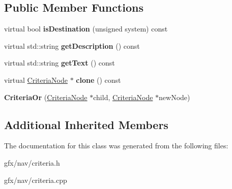 \subsection*{Public Member Functions}
\begin{DoxyCompactItemize}
\item 
virtual bool {\bfseries is\+Destination} (unsigned system) const \hypertarget{classCriteriaOr_af82948cae82350abac4d4ce358ad3736}{}\label{classCriteriaOr_af82948cae82350abac4d4ce358ad3736}

\item 
virtual std\+::string {\bfseries get\+Description} () const \hypertarget{classCriteriaOr_afd2b4d793179caf2f3731a626425c991}{}\label{classCriteriaOr_afd2b4d793179caf2f3731a626425c991}

\item 
virtual std\+::string {\bfseries get\+Text} () const \hypertarget{classCriteriaOr_a97bdb7d3088016af45324b69352e9972}{}\label{classCriteriaOr_a97bdb7d3088016af45324b69352e9972}

\item 
virtual \hyperlink{classCriteriaNode}{Criteria\+Node} $\ast$ {\bfseries clone} () const \hypertarget{classCriteriaOr_afaf885c6b7b3d9616f486652e490f4c6}{}\label{classCriteriaOr_afaf885c6b7b3d9616f486652e490f4c6}

\item 
{\bfseries Criteria\+Or} (\hyperlink{classCriteriaNode}{Criteria\+Node} $\ast$child, \hyperlink{classCriteriaNode}{Criteria\+Node} $\ast$new\+Node)\hypertarget{classCriteriaOr_a0124e6bf414ca4060a2bd1b9fccf9699}{}\label{classCriteriaOr_a0124e6bf414ca4060a2bd1b9fccf9699}

\end{DoxyCompactItemize}
\subsection*{Additional Inherited Members}


The documentation for this class was generated from the following files\+:\begin{DoxyCompactItemize}
\item 
gfx/nav/criteria.\+h\item 
gfx/nav/criteria.\+cpp\end{DoxyCompactItemize}
